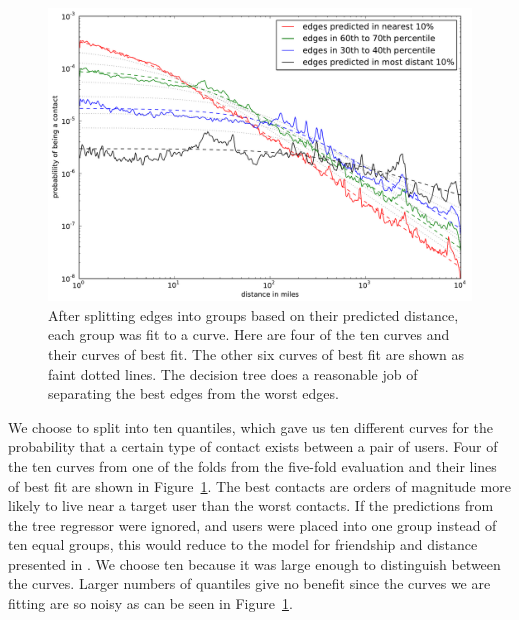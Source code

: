 \begin{figure}[tbh]
\centering
\includegraphics[width=\linewidth]{figures/near_prob_fit.pdf}
\caption{
After splitting edges into groups based on their predicted distance, each group
was fit to a curve. Here are four of the ten curves and their curves of best
fit. The other six curves of best fit are shown as faint dotted lines. The
decision tree does a reasonable job of separating the best edges from the worst
edges.
}
\label{fig:NearProbFit}
\end{figure}

We choose to split into ten quantiles, which gave us ten different curves for the
probability that a certain type of contact exists between a pair of users.
%
Four of the ten curves from one of the folds from the five-fold evaluation and
their lines of best fit are shown in Figure~\ref{fig:NearProbFit}.
%
The best contacts are orders of magnitude more
likely to live near a target user than the worst contacts.
%
If the predictions from the tree regressor were ignored, and users were placed
into one group instead of ten equal groups, this would reduce to the model
for friendship and distance presented in \cite{backstrom2010find}.
%
We choose ten because it was large enough to distinguish between the curves.
%
Larger numbers of quantiles give no benefit since the curves we are
fitting are so noisy as can be seen in Figure~\ref{fig:NearProbFit}.

